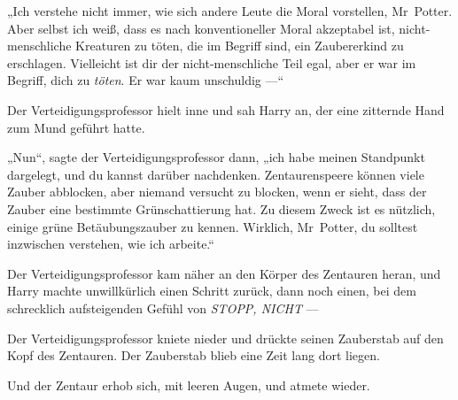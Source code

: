 „Ich verstehe nicht immer, wie sich andere Leute die Moral vorstellen, Mr~Potter. Aber selbst ich weiß, dass es nach konventioneller Moral akzeptabel ist, nicht-menschliche Kreaturen zu töten, die im Begriff sind, ein Zaubererkind zu erschlagen. Vielleicht ist dir der nicht-menschliche Teil egal, aber er war im Begriff, dich zu \emph{töten}. Er war kaum unschuldig —“

Der Verteidigungsprofessor hielt inne und sah Harry an, der eine zitternde Hand zum Mund geführt hatte.

„Nun“, sagte der Verteidigungsprofessor dann, „ich habe meinen Standpunkt dargelegt, und du kannst darüber nachdenken. Zentaurenspeere können viele Zauber abblocken, aber niemand versucht zu blocken, wenn er sieht, dass der Zauber eine bestimmte Grünschattierung hat. Zu diesem Zweck ist es nützlich, einige grüne Betäubungszauber zu kennen. Wirklich, Mr~Potter, du solltest inzwischen verstehen, wie ich arbeite.“

Der Verteidigungsprofessor kam näher an den Körper des Zentauren heran, und Harry machte unwillkürlich einen Schritt zurück, dann noch einen, bei dem schrecklich aufsteigenden Gefühl von \emph{STOPP, NICHT} —

Der Verteidigungsprofessor kniete nieder und drückte seinen Zauberstab auf den Kopf des Zentauren.
%
Der Zauberstab blieb eine Zeit lang dort liegen.

Und der Zentaur erhob sich, mit leeren Augen, und atmete wieder.

